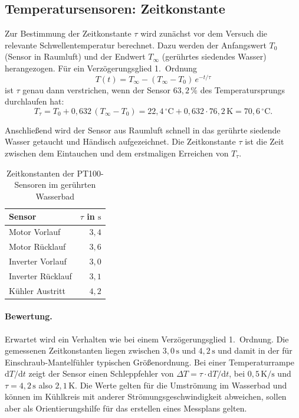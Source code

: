 \subsection{Temperatursensoren: Zeitkonstante}
\label{subsec:val_zeitkonstante}

Zur Bestimmung der Zeitkonstante
$\tau$ wird zunächst vor dem Versuch die relevante Schwellentemperatur
berechnet. Dazu werden der Anfangswert $T_0$ (Sensor in Raumluft) und der
Endwert $T_\infty$ (gerührtes siedendes Wasser) herangezogen. Für ein
Verzögerungsglied 1.~Ordnung
\begin{equation}
    T(t) = T_\infty - (T_\infty - T_0)\,e^{-t/\tau}
\end{equation}
ist $\tau$ genau dann verstrichen, wenn der Sensor $63{,}2\,\%$ des
Temperatursprungs durchlaufen hat:
\begin{equation}
    T_\tau = T_0 + 0{,}632\,(T_\infty - T_0)
    = 22{,}4\,^\circ\mathrm{C} + 0{,}632 \cdot 76{,}2\,\mathrm{K}
    = 70{,}6\,^\circ\mathrm{C}.
\end{equation}

Anschließend wird der Sensor aus Raumluft schnell in das gerührte
siedende Wasser getaucht und Händisch aufgezeichnet. Die
Zeitkonstante $\tau$ ist die Zeit zwischen dem Eintauchen und dem erstmaligen Erreichen von $T_\tau$.

\begin{table}[htbp]
    \centering
    \caption{Zeitkonstanten der PT100-Sensoren im gerührten Wasserbad}
    \label{tab:pt100_tau}
    \begin{tabular}{lr}
        \hline
        Sensor & $\tau$ in $\mathrm{s}$ \\
        \hline
        Motor Vorlauf     & $3{,}4$ \\
        Motor Rücklauf    & $3{,}6$ \\
        Inverter Vorlauf  & $3{,}0$ \\
        Inverter Rücklauf & $3{,}1$ \\
        Kühler Austritt   & $4{,}2$ \\
        \hline
    \end{tabular}
\end{table}

\paragraph{Bewertung.} Erwartet wird ein
Verhalten wie bei einem Verzögerungsglied 1.~Ordnung. Die gemessenen
Zeitkonstanten liegen zwischen $3{,}0\,\mathrm{s}$ und $4{,}2\,\mathrm{s}$
und damit in der für Einschraub-Mantelfühler typischen Größenordnung. Bei
einer Temperaturrampe $\mathrm{d}T/\mathrm{d}t$ zeigt der Sensor einen
Schleppfehler von $\Delta T = \tau \cdot \mathrm{d}T/\mathrm{d}t$, bei
$0{,}5\,\mathrm{K/s}$ und $\tau = 4{,}2\,\mathrm{s}$ also
$2{,}1\,\mathrm{K}$. Die Werte gelten für die Umströmung im Wasserbad
und können im Kühlkreis mit anderer Strömungsgeschwindigkeit abweichen, sollen aber als Orientierungshilfe für das erstellen eines Messplans gelten. 